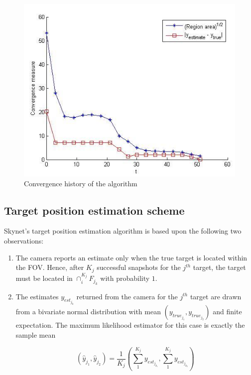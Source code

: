 \begin{figure}
\centering
\includegraphics[scale=0.75]{Figures/mission_phase2_c}
\caption{Convergence history of the algorithm}
\label{fig_mission_phase2_c}
\end{figure}


\subsection{Target position estimation scheme}
\label{sec:TPEA}

Skynet's target position estimation algorithm is based upon the following two observations:

\begin{enumerate}
\item The camera reports an estimate only when the true target is located within the FOV. Hence, after $K_j$ successful snapshots for the $j^{th}$ target, the target must be located in $\cap_i^{K_j} F_{j_k}$ with probability $1$.

\item The estimates $y_{est_{j_k}}$ returned from the camera for the $j^{th}$ target are drawn from a bivariate normal distribution with mean $(y_{true_{j_1}}, y_{true_{j_2}})$ and finite expectation. The maximum likelihood estimator for this case is exactly the sample mean 

\[ (\hat{y}_{j_1}, \hat{y}_{j_2}) = \frac{1}{K_j} \left( \sum\limits_1^{K_j} y_{est_{j_{k_1}}}, \sum\limits_1^{K_j} y_{est_{j_{k_2}}} \right)\]

\end{enumerate}


